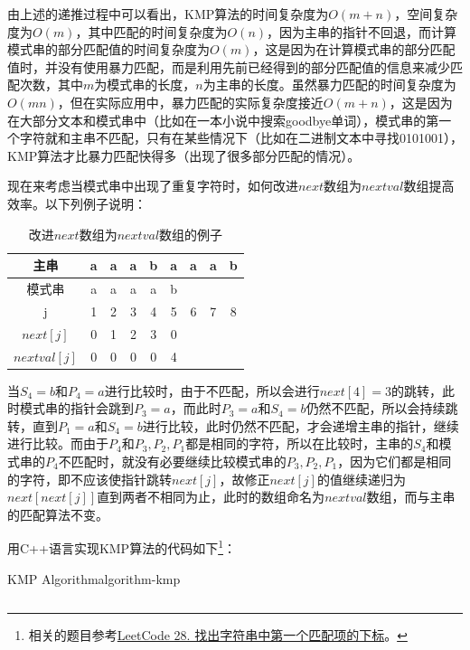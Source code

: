 由上述的递推过程中可以看出，KMP算法的时间复杂度为$O(m + n)$，空间复杂度为$O(m)$，其中匹配的时间复杂度为$O(n)$，因为主串的指针不回退，而计算模式串的部分匹配值的时间复杂度为$O(m)$，这是因为在计算模式串的部分匹配值时，并没有使用暴力匹配，而是利用先前已经得到的部分匹配值的信息来减少匹配次数，其中$m$为模式串的长度，$n$为主串的长度。虽然暴力匹配的时间复杂度为$O(mn)$，但在实际应用中，暴力匹配的实际复杂度接近$O(m + n)$，这是因为在大部分文本和模式串中（比如在一本小说中搜索goodbye单词），模式串的第一个字符就和主串不匹配，只有在某些情况下（比如在二进制文本中寻找0101001），KMP算法才比暴力匹配快得多（出现了很多部分匹配的情况）。

现在来考虑当模式串中出现了重复字符时，如何改进$next$数组为$nextval$数组提高效率。以下列例子说明：

\begin{table}[!htb]
    \centering
    \begin{tabular}{|c|c|c|c|c|c|c|c|c|}
        \hline
        主串 & a & a & a & b & a & a & a & b \\
        \hline
        模式串 & a & a & a & a & b & & & \\
        \hline
        j & 1 & 2 & 3 & 4 & 5 & 6 & 7 & 8 \\
        \hline
        $next[j]$ & 0 & 1 & 2 & 3 & 0 & & & \\
        \hline
        $nextval[j]$ & 0 & 0 & 0 & 0 & 4 & & & \\
        \hline
    \end{tabular}
    \caption{改进$next$数组为$nextval$数组的例子}
\end{table}

当$S_4 = b$和$P_4 = a$进行比较时，由于不匹配，所以会进行$next[4] = 3$的跳转，此时模式串的指针会跳到$P_3 = a$，而此时$P_3 = a$和$S_4 = b$仍然不匹配，所以会持续跳转，直到$P_1 = a$和$S_4 = b$进行比较，此时仍然不匹配，才会递增主串的指针，继续进行比较。而由于$P_4$和$P_3, P_2, P_1$都是相同的字符，所以在比较时，主串的$S_4$和模式串的$P_4$不匹配时，就没有必要继续比较模式串的$P_3, P_2, P_1$，因为它们都是相同的字符，即不应该使指针跳转$next[j]$，故修正$next[j]$的值继续递归为$next[next[j]]$直到两者不相同为止，此时的数组命名为$nextval$数组，而与主串的匹配算法不变。

用C++语言实现KMP算法的代码如下\footnote{相关的题目参考\href{https://leetcode.cn/problems/find-the-index-of-the-first-occurrence-in-a-string?envType=study-plan-v2&envId=programming-skills}{LeetCode 28. 找出字符串中第一个匹配项的下标}。}：

\begin{code}{KMP Algorithm}{algorithm-kmp}
    \inputminted{cpp}{code/algo/kmp.cpp}
\end{code}






















